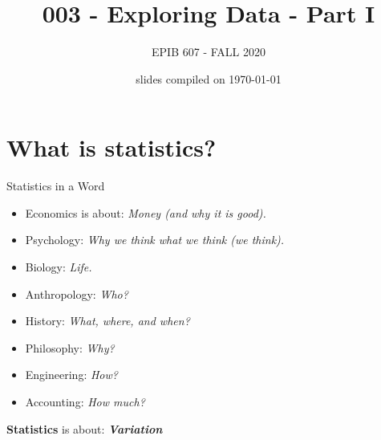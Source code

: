 \documentclass[10pt,handout]{beamer}\usepackage[]{graphicx}\usepackage[]{color}
\begin{document}
	
	
	
	
	\title{003 - Exploring Data - Part I}
	\author{EPIB 607 - FALL 2020}
	
	\date{slides compiled on \today}
	
	\maketitle

\section{What is statistics?}

\begin{frame}{Statistics in a Word}

\begin{itemize}
	\item Economics is about: \textit{Money (and why it is good).}
	\item Psychology: \textit{Why we think what we think (we think).}
	\item Biology: \textit{Life.}
	\item Anthropology: \textit{Who?}
	\item History: \textit{What, where, and when?}
	\item Philosophy: \textit{Why?}
	\item Engineering: \textit{How?}
	\item Accounting: \textit{How much?}
\end{itemize}

\pause 
\vspace*{0.2in}

\textbf{\textcolor{myblue}{Statistics}} is about: \textit{\textbf{Variation}}

\end{frame}
\end{document}
